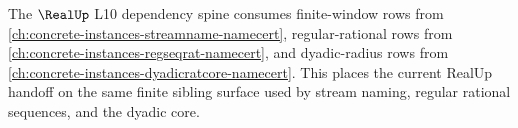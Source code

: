The $\RealUp$ L10 dependency spine consumes finite-window rows from \autoref{ch:concrete-instances-streamname-namecert}, regular-rational rows from \autoref{ch:concrete-instances-regseqrat-namecert}, and dyadic-radius rows from \autoref{ch:concrete-instances-dyadicratcore-namecert}. This places the current RealUp handoff on the same finite sibling surface used by stream naming, regular rational sequences, and the dyadic core.
